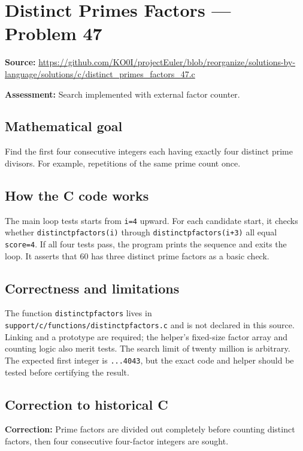 \section{Distinct Primes Factors --- Problem 47}
\label{prob:47}
\noindent\textbf{Source:} \url{https://github.com/KO0I/projectEuler/blob/reorganize/solutions-by-language/solutions/c/distinct_primes_factors_47.c}

\noindent\textbf{Assessment:} Search implemented with external factor counter.

\subsection*{Mathematical goal}
Find the first four consecutive integers each having exactly four distinct prime divisors. For example, repetitions of the same prime count once.

\subsection*{How the C code works}
The main loop tests starts from \verb|i=4| upward. For each candidate start, it checks whether \verb|distinctpfactors(i)| through \verb|distinctpfactors(i+3)| all equal \verb|score=4|. If all four tests pass, the program prints the sequence and exits the loop. It asserts that 60 has three distinct prime factors as a basic check.

\subsection*{Correctness and limitations}
The function \verb|distinctpfactors| lives in \verb|support/c/functions/distinctpfactors.c| and is not declared in this source. Linking and a prototype are required; the helper's fixed-size factor array and counting logic also merit tests. The search limit of twenty million is arbitrary. The expected first integer is \texttt{...4043}, but the exact code and helper should be tested before certifying the result.


\subsection*{Correction to historical C}
{\color{red}\textbf{Correction:} Prime factors are divided out completely before counting distinct factors, then four consecutive four-factor integers are sought.}
